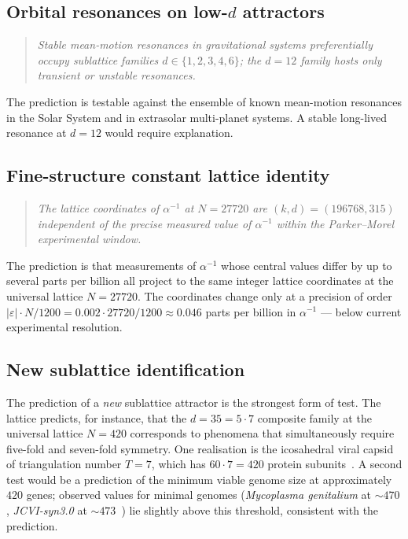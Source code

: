 \documentclass[11pt,a4paper]{article}
\theoremstyle{definition}
\theoremstyle{remark}
\newcommand{\eps}{\varepsilon}
\begin{document}
\subsection{Orbital resonances on low-$d$ attractors}

\begin{quote}\itshape
Stable mean-motion resonances in gravitational systems preferentially occupy sublattice families $d\in\{1,2,3,4,6\}$; the $d=12$ family hosts only transient or unstable resonances.
\end{quote}

The prediction is testable against the ensemble of known mean-motion resonances in the Solar System and in extrasolar multi-planet systems. A stable long-lived resonance at $d=12$ would require explanation.

\subsection{Fine-structure constant lattice identity}

\begin{quote}\itshape
The lattice coordinates of $\alpha^{-1}$ at $N=27720$ are $(k,d)=(196768,315)$ independent of the precise measured value of $\alpha^{-1}$ within the Parker--Morel experimental window.
\end{quote}

The prediction is that measurements of $\alpha^{-1}$ whose central values differ by up to several parts per billion all project to the same integer lattice coordinates at the universal lattice $N=27720$. The coordinates change only at a precision of order $|\eps|\cdot N/1200 = 0.002\cdot 27720/1200 \approx 0.046$ parts per billion in $\alpha^{-1}$ --- below current experimental resolution.

\subsection{New sublattice identification}

The prediction of a \emph{new} sublattice attractor is the strongest form of test. The lattice predicts, for instance, that the $d=35 = 5\cdot 7$ composite family at the universal lattice $N=420$ corresponds to phenomena that simultaneously require five-fold and seven-fold symmetry. One realisation is the icosahedral viral capsid of triangulation number $T=7$, which has $60\cdot 7 = 420$ protein subunits~\cite{CasparKlug}. A second test would be a prediction of the minimum viable genome size at approximately $420$ genes; observed values for minimal genomes (\emph{Mycoplasma genitalium} at $\sim 470$, \emph{JCVI-syn3.0} at $\sim 473$~\cite{Hutchison2016}) lie slightly above this threshold, consistent with the prediction.
\end{document}
